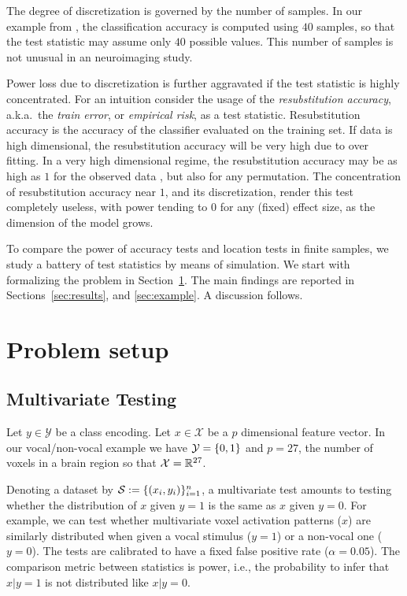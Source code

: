 \documentclass[12pt,a4paper]{article}
\begin{document}
The degree of discretization is governed by the number of samples. 
In our example from \citet{gilron_quantifying_2016}, the classification accuracy is computed using $40$ samples, so that the test statistic may assume only $40$ possible values. 
This number of samples is not unusual in an neuroimaging study. 

Power loss due to discretization is further aggravated if the test statistic is highly concentrated. 
For an intuition consider the usage of the \emph{resubstitution accuracy}, a.k.a.\ the \emph{train error}, or \emph{empirical risk}, as a test statistic. 
Resubstitution accuracy is the accuracy of the classifier evaluated on the training set.
If data is high dimensional, the resubstitution accuracy will be very high due to over fitting. 
In a very high dimensional regime, the resubstitution accuracy may be as high as $1$ for the observed data \cite[Theorem 1]{mclachlan_bias_1976}, but also for any permutation.
The concentration of resubstitution accuracy near $1$, and its discretization, render this test completely useless, with power tending to $0$ for any (fixed) effect size, as the dimension of the model grows. 


To compare the power of accuracy tests and location tests in finite samples, we study a battery of test statistics by means of simulation. 
We start with formalizing the problem in Section~\ref{sec:problem_setup}.
The main findings are reported in Sections~\ref{sec:results}, and \ref{sec:example}.
A discussion follows. 



\section{Problem setup}
\label{sec:problem_setup}


\subsection{Multivariate Testing}

Let $y \in \mathcal{Y}$ be a class encoding. 
Let $x \in \mathcal{X}$ be a $p$ dimensional feature vector. 
In our vocal/non-vocal example we have $\mathcal{Y}=\{ 0,1 \}$ and $p=27$, the number of voxels in a brain region so that $\mathcal{X}=\mathbb{R}^{27}$. 

Denoting a dataset by $\mathcal{S}:=\{(x_i,y_i)\}_{i=1}^n$, a multivariate test amounts to testing whether the distribution of $x$ given $y=1$ is the same as $x$ given $y=0$. 
For example, we can test whether multivariate voxel activation patterns ($x$) are similarly distributed when given a vocal stimulus ($y=1$) or a non-vocal one ($y=0$).
The tests are calibrated to have a fixed false positive rate ($\alpha=0.05$).
The comparison metric between statistics is power, i.e., the probability to infer that $x|y=1$ is not distributed like $x|y=0$.
\end{document}
